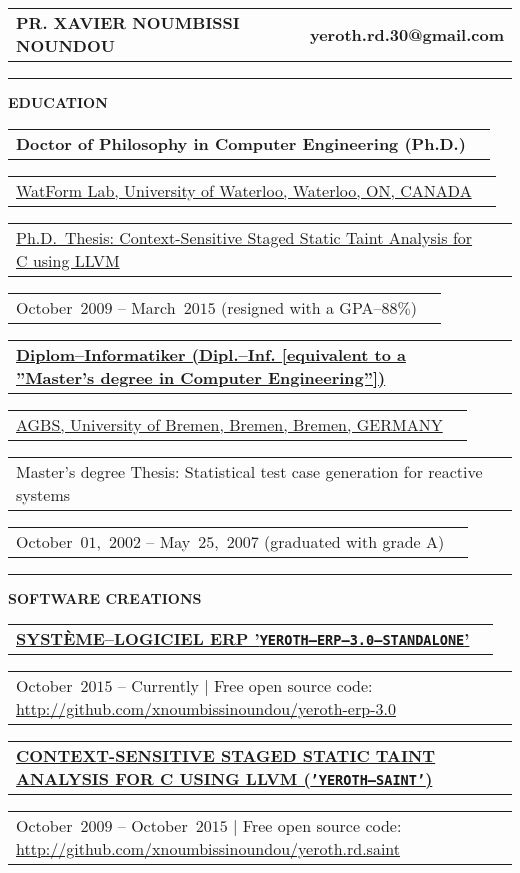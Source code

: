 \documentclass[9pt,a4paper]{article} %
\makeatletter
\newcommand{\headerrow}[2]
{\begin{tabular*}{\linewidth}{l@{\extracolsep{\fill}}r}
	#1 &
	#2 \\
\end{tabular*}}
\newcommand{\headerrowONE}[1]{\headerrow{#1}{}}
\newcommand{\cvitemdate}[2]{#1~$#2$\xspace}
\makeatother
\begin{document}
\bigskip


\headerrow
	{\Large \textbf{PR. XAVIER NOUMBISSI NOUNDOU}}	
	{\large \textbf{yeroth.rd.30@gmail.com}}

\vspace{1em}


\hrule
\begin{center}
{\large \textbf{EDUCATION}}
\end{center}

\vspace{0.5em}

\headerrowONE{\textbf{Doctor of Philosophy in Computer Engineering (Ph.D.)}}	
\headerrowONE{\href{http://watform.uwaterloo.ca/}{WatForm Lab, University of Waterloo, Waterloo, ON, CANADA}}
\headerrowONE{\href{http://archive.org/details/yeroth-saint}{Ph.D.~Thesis: Context-Sensitive Staged Static Taint Analysis for C using LLVM}}
\headerrowONE{\cvitemdate{October}{2009} -- \cvitemdate{March}{2015} (resigned with a GPA--$88\%$)}	
	
\vspace{0.3em}
	
\headerrowONE{\href{http://www.informatik.uni-bremen.de/agbs/qualifikationsarbeiten/diplomarbeiten_e.html}{\textbf{Diplom--Informatiker (Dipl.--Inf. [equivalent to a ''Master's degree in Computer Engineering''])}}}
\headerrowONE{\href{http://www.informatik.uni-bremen.de/agbs/}{AGBS, University of Bremen, Bremen, Bremen, GERMANY}}	
\headerrowONE{Master's degree Thesis: Statistical test case generation for reactive systems}
\headerrowONE{\cvitemdate{October~$01$,}{2002} -- \cvitemdate{May~$25$,}{2007} (graduated with grade A)}	

\vspace{1em}

\hrule
\begin{center}
{\large \textbf{SOFTWARE CREATIONS}}
\end{center}

\vspace{0.5em}

\headerrowONE{\href{http://archive.org/details/yeroth-erp-3-0-info-english}{\textbf{SYSTÈME--LOGICIEL ERP '\texttt{YEROTH--ERP--3.0--STANDALONE}'}}}		
\headerrowONE{\cvitemdate{October}{2015} -- Currently | Free open source code: \url{http://github.com/xnoumbissinoundou/yeroth-erp-3.0}}

\vspace{0.3em}

\headerrowONE{\href{http://archive.org/details/yeroth-saint}{\textbf{CONTEXT-SENSITIVE STAGED STATIC TAINT ANALYSIS FOR C USING LLVM (\texttt{'YEROTH--SAINT'})}}}
\headerrowONE{\cvitemdate{October}{2009} -- \cvitemdate{October}{2015} | Free open source code: \url{http://github.com/xnoumbissinoundou/yeroth.rd.saint}}
	
\end{document}
